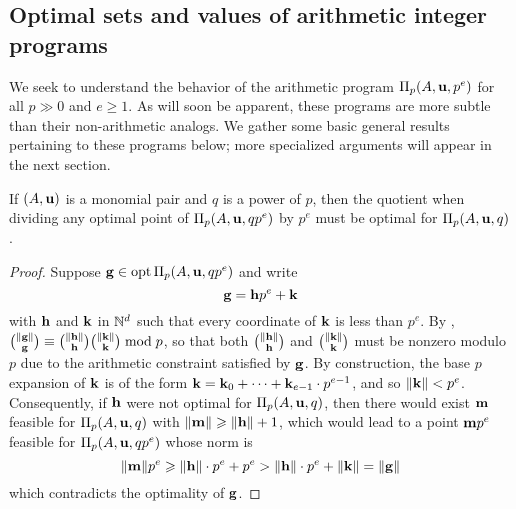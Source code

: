 \documentclass[11pt]{amsart}
\begin{document}
\subsection{Optimal sets and values of arithmetic integer programs}

We seek to understand the behavior of the arithmetic program $\Pi_p(A, \mathbf{u}, p^e)$ for all $p \gg 0$ and $e \geq 1$.
As will soon be apparent, these programs are more subtle than their non-arithmetic analogs.
We gather some basic general results pertaining to these programs below;  more specialized arguments will appear in the next section.

\begin{lemma}
   \label{optimal division: L}
   If $(A, \mathbf{u})$ is a monomial pair and $q$ is a power of $p$, then the quotient when dividing any optimal point of $\Pi_p(A, \mathbf{u}, qp^e)$ by $p^e$ must be optimal for $\Pi_p(A, \mathbf{u}, q)$.
\end{lemma}

\begin{proof}  Suppose $\mathbf{g} \in \operatorname{opt} \Pi_p(A, \mathbf{u}, qp^e)$ and write
\[ \mathbf{g} = \mathbf{h} p^e + \mathbf{k} \]
with $\mathbf{h}$ and $\mathbf{k}$ in $\mathbb{N}^d$ such that every coordinate of $\mathbf{k}$ is less than $p^e$.
By , $\binom{\| \mathbf{g} \|}{\mathbf{g}} \equiv \binom{\| \mathbf{h} \|}{\mathbf{h}} \binom{\| \mathbf{k} \|}{\mathbf{k}} \bmod p$, so that both $\binom{\| \mathbf{h} \|}{\mathbf{h}}$ and $\binom{\| \mathbf{k} \|}{\mathbf{k}}$ must be nonzero modulo $p$ due to the arithmetic constraint satisfied by $\mathbf{g}$.
By construction,  the base $p$ expansion of $\mathbf{k}$ is of the form $\mathbf{k} = \mathbf{k}_0 + \cdots + \mathbf{k}_{e-1} \cdot p^{e-1}$, and so %
$\| \mathbf{k} \| < p^e$.
Consequently, if $\mathbf{h}$ were not optimal for $\Pi_p(A, \mathbf{u}, q)$, then there would exist $\mathbf{m}$ feasible for $\Pi_p(A, \mathbf{u}, q)$ with $\| \mathbf{m} \| \geqslant \| \mathbf{h} \| + 1$, which would lead to a point $\mathbf{m}p^e$ feasible for $\Pi_p(A, \mathbf{u}, qp^e)$ whose norm is \[ \| \mathbf{m} \|p^e \geqslant \| \mathbf{h} \| \cdot p^e + p^e >  \| \mathbf{h} \| \cdot p^e + \| \mathbf{k} \| = \| \mathbf{g} \|\] which contradicts the optimality of $\mathbf{g}$. %
\end{proof}
\end{document}
